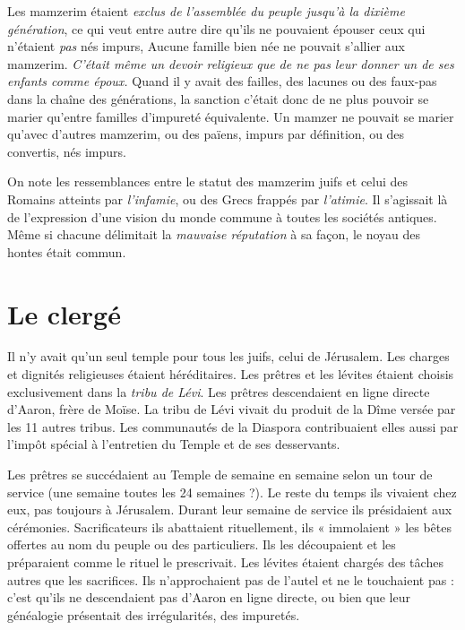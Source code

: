  Les mamzerim étaient \emph{exclus de l'assemblée du peuple jusqu'à la dixième génération}, ce qui veut entre autre dire qu'ils ne pouvaient épouser ceux qui n'étaient \emph{pas} nés impurs, Aucune famille bien née ne pouvait s'allier aux mamzerim. \emph{C'était même un devoir religieux que de ne pas leur donner un de ses enfants comme époux.} Quand il y avait des failles, des lacunes ou des faux-pas dans la chaîne des générations, la sanction c'était donc de ne plus pouvoir se marier qu'entre familles d'impureté équivalente. Un mamzer ne pouvait se marier qu'avec d'autres mamzerim, ou des païens, impurs par définition, ou des convertis, nés impurs. 

 On note les ressemblances entre le statut des mamzerim juifs et celui des Romains atteints par \emph{l'infamie}, ou des Grecs frappés par \emph{l'atimie}. Il s'agissait là de l'expression d'une vision du monde commune à toutes les sociétés antiques. Même si chacune délimitait la \emph{mauvaise réputation} à sa façon, le noyau des hontes était commun. 


\section{Le clergé}

 Il n'y avait qu'un seul temple pour tous les juifs, celui de Jérusalem. Les charges et dignités religieuses étaient héréditaires. Les prêtres et les lévites étaient choisis exclusivement dans la \emph{tribu de Lévi}. Les prêtres descendaient en ligne directe d'Aaron, frère de Moïse. La tribu de Lévi vivait du produit de la Dîme versée par les 11 autres tribus. Les communautés de la Diaspora contribuaient elles aussi par l'impôt spécial  à l'entretien du Temple et de ses desservants. 

 Les prêtres se succédaient au Temple de semaine en semaine selon un tour de service (une semaine toutes les 24 semaines ?). Le reste du temps ils vivaient chez eux, pas toujours à Jérusalem. Durant leur semaine de service ils présidaient aux cérémonies. Sacrificateurs ils abattaient rituellement, ils « immolaient » les bêtes offertes au nom du peuple ou des particuliers. Ils les découpaient et les préparaient comme le rituel le prescrivait. Les lévites étaient chargés des tâches autres que les sacrifices. Ils n'approchaient pas de l'autel et ne le touchaient pas : c'est qu'ils ne descendaient pas d'Aaron en ligne directe, ou bien que leur généalogie présentait des irrégularités, des impuretés.

